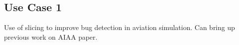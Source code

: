 \subsection{Use Case 1}

Use of slicing to improve bug detection in aviation simulation. Can
bring up previous work on AIAA paper.
